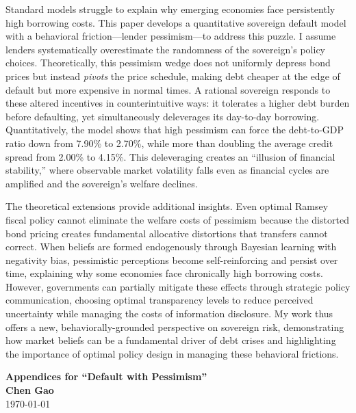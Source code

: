 \documentclass[12pt]{article}
\theoremstyle{plain}
\begin{document}
Standard models struggle to explain why emerging economies face persistently
high borrowing costs. This paper develops a quantitative sovereign default
model with a behavioral friction---lender pessimism---to address this puzzle. I
assume lenders systematically overestimate the randomness of the sovereign's
policy choices. Theoretically, this pessimism wedge does not uniformly depress
bond prices but instead \textit{pivots} the price schedule, making debt cheaper
at the edge of default but more expensive in normal times. A rational sovereign
responds to these altered incentives in counterintuitive ways: it tolerates a
higher debt burden before defaulting, yet simultaneously deleverages its
day-to-day borrowing. Quantitatively, the model shows that high pessimism can
force the debt-to-GDP ratio down from 7.90\% to 2.70\%, while more than
doubling the average credit spread from 2.00\% to 4.15\%. This deleveraging
creates an ``illusion of financial stability,'' where observable market
volatility falls even as financial cycles are amplified and the sovereign's
welfare declines.

The theoretical extensions provide additional insights. Even optimal Ramsey
fiscal policy cannot eliminate the welfare costs of pessimism because the
distorted bond pricing creates fundamental allocative distortions that
transfers cannot correct. When beliefs are formed endogenously through Bayesian
learning with negativity bias, pessimistic perceptions become self-reinforcing
and persist over time, explaining why some economies face chronically high
borrowing costs. However, governments can partially mitigate these effects
through strategic policy communication, choosing optimal transparency levels to
reduce perceived uncertainty while managing the costs of information
disclosure. My work thus offers a new, behaviorally-grounded perspective on
sovereign risk, demonstrating how market beliefs can be a fundamental driver of
debt crises and highlighting the importance of optimal policy design in
managing these behavioral frictions.

\clearpage
\appendix

\setcounter{equation}{0}
\renewcommand{\theequation}{\thesection.\arabic{equation}}

\begin{center}
	\Large \textbf{Appendices for ``Default with Pessimism''}\\
	\vspace{0.5cm}
	\large \textbf{Chen Gao}
	\\
	\large \today
\end{center}
\end{document}
